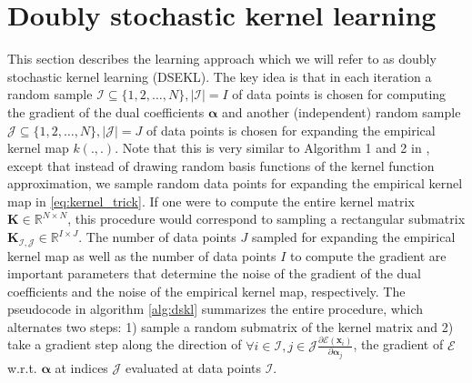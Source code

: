 \documentclass{article} %
\newcommand{\R}{\ensuremath{\mathds{R}}}
\newcommand{\va}{\boldsymbol{\alpha}}
\renewcommand{\vec}[1]{\mathbf{#1}}
\begin{document}
\section{Doubly stochastic kernel learning}\label{sec:dskl}
This section describes the learning approach which we will refer to as doubly stochastic kernel learning (DSEKL). The key idea is that in each iteration a random sample $\mathcal{I}\subseteq\{1,2,\dots,N\}, |\mathcal{I}|=I$ of data points is chosen for computing the gradient of the dual coefficients $\va$ and another (independent) random sample  $\mathcal{J}\subseteq\{1,2,\dots,N\}, |\mathcal{J}|=J$ of data points is chosen for expanding the empirical kernel map $k(.,.)$. Note that this is very similar to Algorithm 1 and 2 in \cite{Dai2014}, except that instead of drawing random basis functions of the kernel function approximation, we sample random data points for expanding the empirical kernel map in \autoref{eq:kernel_trick}. If one were to compute the entire kernel matrix $\vec{K}\in\R^{N\times N}$, this procedure would correspond to sampling a rectangular submatrix $\vec{K}_{\mathcal{I,J}}\in\R^{I\times J}$. The number of data points $J$ sampled for expanding the empirical kernel map as well as the number of data points $I$ to compute the gradient are important parameters that determine the noise of the gradient of the dual coefficients and the noise of the empirical kernel map, respectively. The pseudocode in algorithm \autoref{alg:dskl} summarizes the entire procedure, which alternates two steps: 1) sample a random submatrix of the kernel matrix and 2) take a gradient step along the direction of $\forall i\in \mathcal{I}, j\in\mathcal{J} \frac{\partial\mathcal{E}(\vec{x}_i)}{\partial \va_{j}}$, the gradient of $\mathcal{E}$ w.r.t. $\va$ at indices $\mathcal{J}$ evaluated at data points $\mathcal{I}$.
\end{document}
